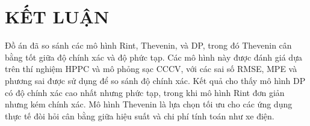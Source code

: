 \documentclass{thesis}
\begin{document}
    \section*{KẾT LUẬN}
    Đồ án đã so sánh các mô hình Rint, Thevenin, và DP, trong đó Thevenin cân bằng tốt giữa độ chính xác và độ phức tạp. Các mô hình này được đánh giá dựa trên thí nghiệm HPPC và mô phỏng sạc CCCV, với các sai số RMSE, MPE và phương sai được sử dụng để so sánh độ chính xác. Kết quả cho thấy mô hình DP có độ chính xác cao nhất nhưng phức tạp, trong khi mô hình Rint đơn giản nhưng kém chính xác. Mô hình Thevenin là lựa chọn tối ưu cho các ứng dụng thực tế đòi hỏi cân bằng giữa hiệu suất và chi phí tính toán như xe điện.

    
    
    \newpage
\end{document}
